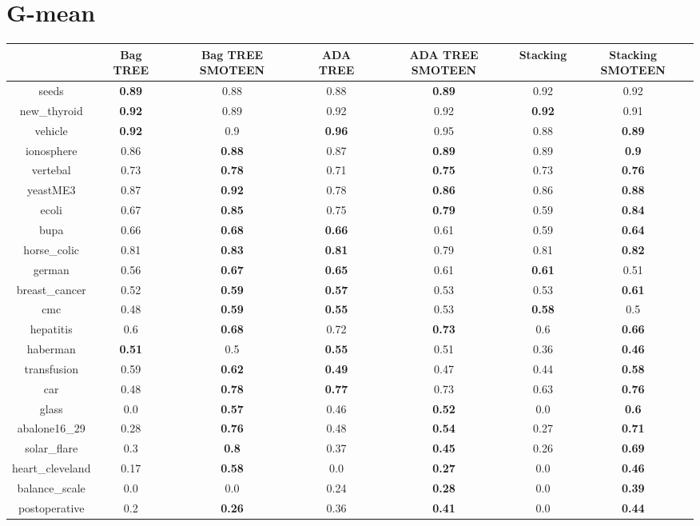 \documentclass{article}%
\begin{document}
%
\section*{G{-}mean}%
\begin{tabular}{c|cccccc}%
&Bag TREE&Bag TREE SMOTEEN&ADA TREE&ADA TREE SMOTEEN&Stacking&Stacking SMOTEEN\\%
\hline%
seeds&\textbf{0.89}&0.88&0.88&\textbf{0.89}&0.92&0.92\\%
new\_thyroid&\textbf{0.92}&0.89&0.92&0.92&\textbf{0.92}&0.91\\%
vehicle&\textbf{0.92}&0.9&\textbf{0.96}&0.95&0.88&\textbf{0.89}\\%
ionosphere&0.86&\textbf{0.88}&0.87&\textbf{0.89}&0.89&\textbf{0.9}\\%
vertebal&0.73&\textbf{0.78}&0.71&\textbf{0.75}&0.73&\textbf{0.76}\\%
yeastME3&0.87&\textbf{0.92}&0.78&\textbf{0.86}&0.86&\textbf{0.88}\\%
ecoli&0.67&\textbf{0.85}&0.75&\textbf{0.79}&0.59&\textbf{0.84}\\%
bupa&0.66&\textbf{0.68}&\textbf{0.66}&0.61&0.59&\textbf{0.64}\\%
horse\_colic&0.81&\textbf{0.83}&\textbf{0.81}&0.79&0.81&\textbf{0.82}\\%
german&0.56&\textbf{0.67}&\textbf{0.65}&0.61&\textbf{0.61}&0.51\\%
breast\_cancer&0.52&\textbf{0.59}&\textbf{0.57}&0.53&0.53&\textbf{0.61}\\%
cmc&0.48&\textbf{0.59}&\textbf{0.55}&0.53&\textbf{0.58}&0.5\\%
hepatitis&0.6&\textbf{0.68}&0.72&\textbf{0.73}&0.6&\textbf{0.66}\\%
haberman&\textbf{0.51}&0.5&\textbf{0.55}&0.51&0.36&\textbf{0.46}\\%
transfusion&0.59&\textbf{0.62}&\textbf{0.49}&0.47&0.44&\textbf{0.58}\\%
car&0.48&\textbf{0.78}&\textbf{0.77}&0.73&0.63&\textbf{0.76}\\%
glass&0.0&\textbf{0.57}&0.46&\textbf{0.52}&0.0&\textbf{0.6}\\%
abalone16\_29&0.28&\textbf{0.76}&0.48&\textbf{0.54}&0.27&\textbf{0.71}\\%
solar\_flare&0.3&\textbf{0.8}&0.37&\textbf{0.45}&0.26&\textbf{0.69}\\%
heart\_cleveland&0.17&\textbf{0.58}&0.0&\textbf{0.27}&0.0&\textbf{0.46}\\%
balance\_scale&0.0&0.0&0.24&\textbf{0.28}&0.0&\textbf{0.39}\\%
postoperative&0.2&\textbf{0.26}&0.36&\textbf{0.41}&0.0&\textbf{0.44}\\%
\end{tabular}

%
\end{document}
